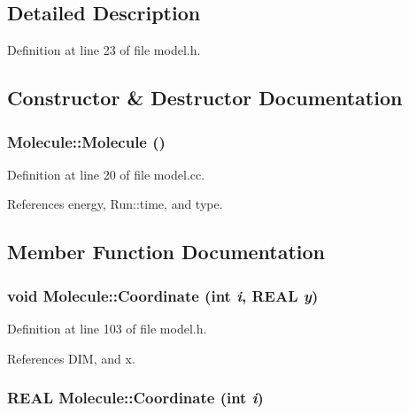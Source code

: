 \subsection{Detailed Description}


Definition at line 23 of file model.h.

\subsection{Constructor \& Destructor Documentation}
\hypertarget{classMolecule_7e7d290ae641518ad4c4d5303b519d0f}{
\subsubsection[{Molecule}]{\setlength{\rightskip}{0pt plus 5cm}Molecule::Molecule ()}}
\label{classMolecule_7e7d290ae641518ad4c4d5303b519d0f}




Definition at line 20 of file model.cc.

References energy, Run::time, and type.

\subsection{Member Function Documentation}
\hypertarget{classMolecule_f9ce4f748a740168da3fcd3a8488c40c}{
\subsubsection[{Coordinate}]{\setlength{\rightskip}{0pt plus 5cm}void Molecule::Coordinate (int {\em i}, \/  REAL {\em y})}}
\label{classMolecule_f9ce4f748a740168da3fcd3a8488c40c}




Definition at line 103 of file model.h.

References DIM, and x.\hypertarget{classMolecule_aee00f4809061c5e52b9abdbcbd9ed08}{
\subsubsection[{Coordinate}]{\setlength{\rightskip}{0pt plus 5cm}REAL Molecule::Coordinate (int {\em i})}}
\label{classMolecule_aee00f4809061c5e52b9abdbcbd9ed08}




